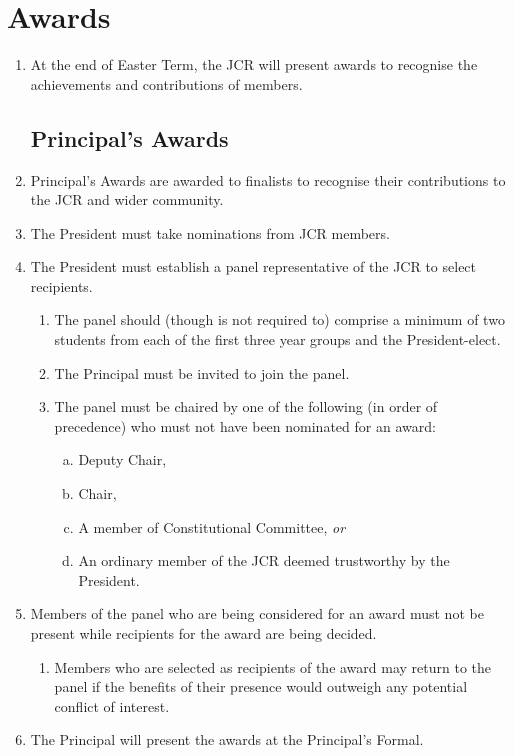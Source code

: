\documentclass[12pt]{article}
\begin{document}
\section{Awards}
\begin{enumerate}
    \item At the end of Easter Term, the JCR will present awards to recognise the achievements and contributions of members.
    \subsection{Principal's Awards}
    \item Principal's Awards are awarded to finalists to recognise their contributions to the JCR and wider community.
    \item The President must take nominations from JCR members.
    \item The President must establish a panel representative of the JCR to select recipients.
    \begin{enumerate}
        \item The panel should (though is not required to) comprise a minimum of two students from each of the first three year groups and the President-elect.
        \item The Principal must be invited to join the panel.
        \item The panel must be chaired by one of the following (in order of precedence) who must not have been nominated for an award:
        \begin{enumerate}[(a)]
            \item Deputy Chair,
            \item Chair,
            \item A member of Constitutional Committee, \emph{or}
            \item An ordinary member of the JCR deemed trustworthy by the President.
        \end{enumerate}
    \end{enumerate}
    \item Members of the panel who are being considered for an award must not be present while recipients for the award are being decided.
    \begin{enumerate}
        \item Members who are selected as recipients of the award may return to the panel if the benefits of their presence would outweigh any potential conflict of interest.
    \end{enumerate}
    \item The Principal will present the awards at the Principal's Formal.

\end{enumerate}
\end{document}
